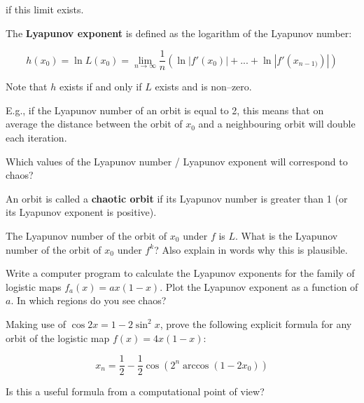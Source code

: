 if this limit exists.

The \textbf{Lyapunov exponent} is defined as the logarithm of the Lyapunov number:

\begin{equation}
h(x_0) = \ln L(x_0) = \lim _{n \to \infty}\frac{1}{n}\left(\ln\left|f'(x_0)\right| + ... + \ln\left|f'(x_{n-1)})\right|\right)
\end{equation} 

Note that $h$ exists if and only if $L$ exists and is non--zero.

E.g., if the Lyapunov number of an orbit is equal to 2, this means that on average the distance between the orbit of $x_0$ and a neighbouring orbit will double each iteration.

\begin{cue}
Which values of the Lyapunov number / Lyapunov exponent will correspond to chaos?  
\end{cue}

An orbit is called a \textbf{chaotic orbit} if its Lyapunov number is greater than 1 (or its Lyapunov exponent is positive). 

\pagebreak

\begin{exer}
The Lyapunov number of the orbit of $x_0$ under $f$ is $L$. What is the Lyapunov number of the orbit of $x_0$ under $f^k$? Also explain in words why this is plausible.
\end{exer}

\begin{exer}
Write a computer program to calculate the Lyapunov exponents for the family of logistic maps $f_a(x)=ax(1-x)$. Plot the Lyapunov exponent as a function of $a$. In which regions do you see chaos?
\end{exer}


\begin{exer}
Making use of $\cos 2x = 1- 2 \sin^2 x$, prove the following explicit formula for any orbit of the logistic map $f(x) = 4x(1-x)$:

$$x_n= \frac{1}{2} -\frac{1}{2} \cos(2^n\arccos(1-2x_0))$$

Is this a useful formula from a computational point of view?
\end{exer}


\pagebreak


